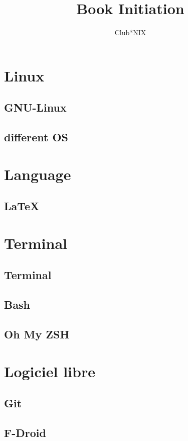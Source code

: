 \documentclass[a4paper]{report}
\title{Book Initiation}
\author{Club*NIX}
\begin{document}
\maketitle

\tableofcontents
\newpage


\chapter{Linux}
 \section{GNU-Linux}
    
 \section{different OS}
    
    
\chapter{Language}
  \section{LaTeX}
    
    
    
\chapter{Terminal}
  \section{Terminal}
    
  \section{Bash}
    
  \section{Oh My ZSH}
    
    
\chapter{Logiciel libre}
  \section{Git}
    
  \section{F-Droid}
    
    
\end{document}
